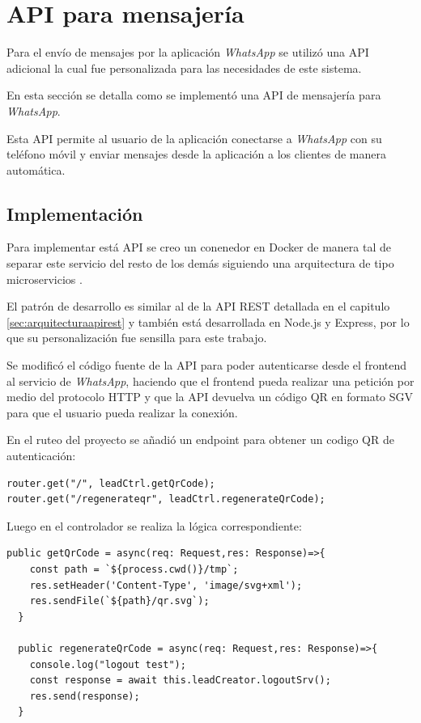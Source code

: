 \section{API para mensajería}
\label{sec:apimessenger}

Para el envío de mensajes por la aplicación \textit{WhatsApp} \cite{whatsapp} se utilizó una API adicional \cite{api-whatsapp-ts} la cual fue personalizada para las necesidades de este sistema.

En esta sección se detalla como se implementó una API de mensajería para \textit{WhatsApp}.

Esta API permite al usuario de la aplicación conectarse a \textit{WhatsApp} con su teléfono móvil y enviar mensajes desde la aplicación a los clientes de manera automática.

\subsection{Implementación}
\label{subsec:apimessengerimplementación}

Para implementar está API se creo un conenedor en Docker de manera tal de separar este servicio del resto de los demás siguiendo una arquitectura de tipo microservicios \cite{microservices-docs}.

El patrón de desarrollo es similar al de la API REST detallada en el capitulo \ref{sec:arquitecturaapirest} y también está desarrollada en Node.js y Express, por lo que su personalización fue sensilla para este trabajo.

Se modificó el código fuente de la API para poder autenticarse desde el frontend al servicio de \textit{WhatsApp}, haciendo que el frontend pueda realizar una petición por medio del protocolo HTTP y que la API devuelva un código QR \cite{qr-code} en formato SGV \cite{svg-format} para que el usuario pueda realizar la conexión. 

En el ruteo del proyecto se añadió un endpoint para obtener un codigo QR de autenticación:

\begin{lstlisting}[label=cod:apimessengerroute,caption=Endpoint para obtener código QR.]
router.get("/", leadCtrl.getQrCode);
router.get("/regenerateqr", leadCtrl.regenerateQrCode);
\end{lstlisting}

Luego en el controlador se realiza la lógica correspondiente:

\begin{lstlisting}[label=cod:apimessengercontroller,caption=Controlador de ruta para obtener código QR.]
  public getQrCode = async(req: Request,res: Response)=>{
    const path = `${process.cwd()}/tmp`;
    res.setHeader('Content-Type', 'image/svg+xml');
    res.sendFile(`${path}/qr.svg`);
  }

  public regenerateQrCode = async(req: Request,res: Response)=>{
    console.log("logout test");
    const response = await this.leadCreator.logoutSrv();
    res.send(response);
  }
\end{lstlisting}

